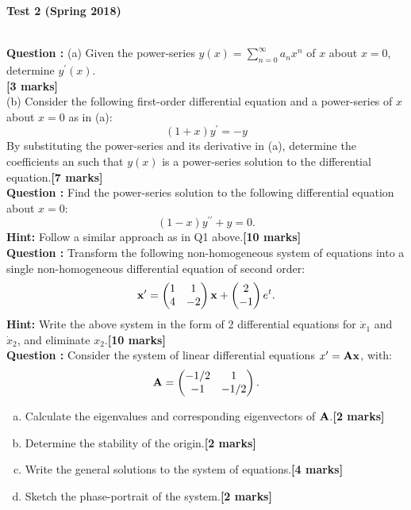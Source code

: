 \documentclass[11pt,a4paper]{article}
\newcounter{mk}
\newcommand{\mrk}[1]{\hfill\textbf{[#1 marks]}}
\newcommand{\qtion}{\stepcounter{mk}\textbf{Question \arabic{mk}: }}
\begin{document}
	\begin{center}
		\textbf{\large Test 2 (Spring 2018)}
	\end{center}
	\\[1cm]
	\qtion (a) Given the power-series $y(x) = \sum_{n = 0}^\infty a_nx^n$ of $x$ about $x = 0$, determine $y^\prime(x)$.\\
	\vspace*{0ex}\mrk{3}\\
	(b) Consider the following first-order differential equation and a power-series of $x$ about $x = 0$ as in (a):
	$$
	(1 + x)y^\prime = -y
	$$
	By substituting the power-series and its derivative in (a), determine the coefficients an such that $y(x)$ is a power-series solution to the differential equation.\mrk{7}\\
	\qtion Find the power-series solution to the following differential equation about $x = 0$:
	$$
	(1 - x)y^{\prime\prime} + y = 0.
	$$
	\textbf{Hint:} Follow a similar approach as in Q1 above.\mrk{10}\\
	\qtion Transform the following non-homogeneous system of equations into a single non-homogeneous differential equation of second order:
	$$
	\vb{x}^\prime =
	\begin{pmatrix}
		1 & 1\\
		4 & -2
	\end{pmatrix}\vb{x} +
	\begin{pmatrix}
		2\\
		-1
	\end{pmatrix}e^t.
	$$
	\textbf{Hint:} Write the above system in the form of 2 differential equations for $\dot{x}_1$ and $\dot{x}_2$, and eliminate $x_2$.\mrk{10}\\
	\qtion Consider the system of linear differential equations $x^\prime = \vb{Ax}$, with:
	$$
	\vb{A} =
	\begin{pmatrix}
		-1/2 & 1\\
		-1 & -1/2
	\end{pmatrix}.
	$$
	\begin{enumerate}[(a)]
		\item Calculate the eigenvalues and corresponding eigenvectors of $\vb{A}$.\mrk{2}
		\item Determine the stability of the origin.\mrk{2}
		\item  Write the general solutions to the system of equations.\mrk{4}
		\item  Sketch the phase-portrait of the system.\mrk{2}
	\end{enumerate}
\end{document}
